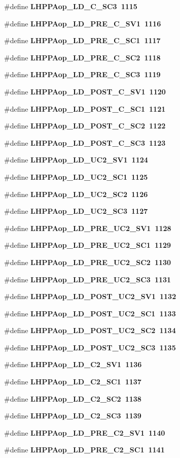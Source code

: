 \begin{CompactItemize}
\#define \bf{LHPPAop\_\-LD\_\-C\_\-SC3}~1115
\item 
\#define \bf{LHPPAop\_\-LD\_\-PRE\_\-C\_\-SV1}~1116
\item 
\#define \bf{LHPPAop\_\-LD\_\-PRE\_\-C\_\-SC1}~1117
\item 
\#define \bf{LHPPAop\_\-LD\_\-PRE\_\-C\_\-SC2}~1118
\item 
\#define \bf{LHPPAop\_\-LD\_\-PRE\_\-C\_\-SC3}~1119
\item 
\#define \bf{LHPPAop\_\-LD\_\-POST\_\-C\_\-SV1}~1120
\item 
\#define \bf{LHPPAop\_\-LD\_\-POST\_\-C\_\-SC1}~1121
\item 
\#define \bf{LHPPAop\_\-LD\_\-POST\_\-C\_\-SC2}~1122
\item 
\#define \bf{LHPPAop\_\-LD\_\-POST\_\-C\_\-SC3}~1123
\item 
\#define \bf{LHPPAop\_\-LD\_\-UC2\_\-SV1}~1124
\item 
\#define \bf{LHPPAop\_\-LD\_\-UC2\_\-SC1}~1125
\item 
\#define \bf{LHPPAop\_\-LD\_\-UC2\_\-SC2}~1126
\item 
\#define \bf{LHPPAop\_\-LD\_\-UC2\_\-SC3}~1127
\item 
\#define \bf{LHPPAop\_\-LD\_\-PRE\_\-UC2\_\-SV1}~1128
\item 
\#define \bf{LHPPAop\_\-LD\_\-PRE\_\-UC2\_\-SC1}~1129
\item 
\#define \bf{LHPPAop\_\-LD\_\-PRE\_\-UC2\_\-SC2}~1130
\item 
\#define \bf{LHPPAop\_\-LD\_\-PRE\_\-UC2\_\-SC3}~1131
\item 
\#define \bf{LHPPAop\_\-LD\_\-POST\_\-UC2\_\-SV1}~1132
\item 
\#define \bf{LHPPAop\_\-LD\_\-POST\_\-UC2\_\-SC1}~1133
\item 
\#define \bf{LHPPAop\_\-LD\_\-POST\_\-UC2\_\-SC2}~1134
\item 
\#define \bf{LHPPAop\_\-LD\_\-POST\_\-UC2\_\-SC3}~1135
\item 
\#define \bf{LHPPAop\_\-LD\_\-C2\_\-SV1}~1136
\item 
\#define \bf{LHPPAop\_\-LD\_\-C2\_\-SC1}~1137
\item 
\#define \bf{LHPPAop\_\-LD\_\-C2\_\-SC2}~1138
\item 
\#define \bf{LHPPAop\_\-LD\_\-C2\_\-SC3}~1139
\item 
\#define \bf{LHPPAop\_\-LD\_\-PRE\_\-C2\_\-SV1}~1140
\item 
\#define \bf{LHPPAop\_\-LD\_\-PRE\_\-C2\_\-SC1}~1141

\end{CompactItemize}
